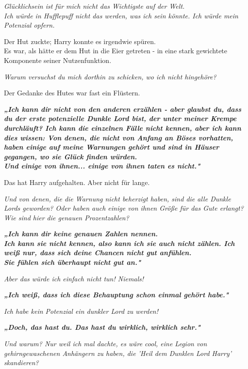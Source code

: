 {\emph{Glücklichsein ist für mich nicht das Wichtigste auf der Welt.\\ Ich würde in Hufflepuff nicht das werden, was ich sein könnte. Ich würde mein Potenzial opfern.}

Der Hut zuckte; Harry konnte es irgendwie spüren.\\ Es war, als hätte er dem Hut in die Eier getreten - in eine stark gewichtete Komponente seiner Nutzenfunktion.

\emph{Warum versuchst du mich dorthin zu schicken, wo ich nicht hingehöre?}

Der Gedanke des Hutes war fast ein Flüstern.

\textbf{\emph{„Ich kann dir nicht von den anderen erzählen - aber glaubst du, dass du der erste potenzielle Dunkle Lord bist, der unter meiner Krempe durchläuft? Ich kann die einzelnen Fälle nicht kennen, aber ich kann dies wissen: Von denen, die nicht von Anfang an Böses vorhatten, haben einige auf meine Warnungen gehört und sind in Häuser gegangen, wo sie Glück finden würden.\\ Und einige von ihnen... einige von ihnen taten es nicht."}}

Das hat Harry aufgehalten. Aber nicht für lange.

\emph{Und von denen, die die Warnung nicht beherzigt haben, sind die alle Dunkle Lords geworden? Oder haben auch einige von ihnen Größe für das Gute erlangt? Wie sind hier die genauen Prozentzahlen?}

\textbf{\emph{„Ich kann dir keine genauen Zahlen nennen.\\ Ich kann sie nicht kennen, also kann ich sie auch nicht zählen. Ich weiß nur, dass sich deine Chancen nicht gut anfühlen.\\ Sie fühlen sich überhaupt nicht gut an."}}

\emph{Aber das würde ich einfach nicht tun! Niemals!}

\textbf{\emph{„Ich weiß, dass ich diese Behauptung schon einmal gehört habe."}}

\emph{Ich habe kein Potenzial ein dunkler Lord zu werden!}

\textbf{\emph{„Doch, das hast du. Das hast du wirklich, wirklich sehr."}}

\emph{Und warum? Nur weil ich mal dachte, es wäre cool, eine Legion von gehirngewaschenen Anhängern zu haben, die 'Heil dem Dunklen Lord Harry' skandieren?}

}

